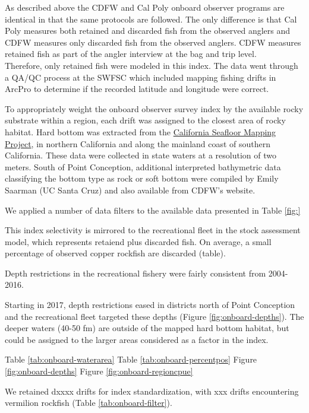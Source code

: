 \documentclass[11pt,
  english,
  letterpaper,
]{article}
\begin{document}
As described above the CDFW and Cal Poly onboard observer programs are identical in that the same protocols are followed. The only difference is that Cal Poly measures both retained and discarded fish from the observed anglers and CDFW measures only discarded fish from the observed anglers. CDFW measures retained fish as part of the angler interview at the bag and trip level.\\
Therefore, only retained fish were modeled in this index. The data went through a QA/QC process at the SWFSC which included mapping fishing drifts in ArcPro to determine if the recorded latitude and longitude were correct.

To appropriately weight the onboard observer survey index by the available rocky substrate within a region, each drift was assigned to the closest area of rocky habitat. Hard bottom was extracted from the \href{http://seafloor.otterlabs.org/index.html}{California Seafloor Mapping Project}, in northern California and along the mainland coast of southern California. These data were collected in state waters at a resolution of two meters. South of Point Conception, additional interpreted bathymetric data classifying the bottom type as rock or soft bottom were compiled by Emily Saarman (UC Santa Cruz) and also available from CDFW's website.

We applied a number of data filters to the available data presented in Table \ref{fig:}

This index selectivity is mirrored to the recreational fleet in the stock assessment model, which represents retaiend plus discarded fish. On average, a small percentage of observed copper rockfish are discarded (table).

Depth restrictions in the recreational fishery were fairly consistent from 2004-2016.

Starting in 2017, depth restrictions eased in districts north of Point Conception and the recreational fleet targeted these depths (Figure \ref{fig:onboard-depths}). The deeper waters (40-50 fm) are outside of the mapped hard bottom habitat, but could be assigned to the larger areas considered as a factor in the index.

Table \ref{tab:onboard-waterarea} Table \ref{tab:onboard-percentpos} Figure \ref{fig:onboard-depths} Figure \ref{fig:onboard-regioncpue}

We retained dxxxx drifts for index standardization, with xxx drifts encountering vermilion rockfish (Table \ref{tab:onboard-filter}).
\end{document}
